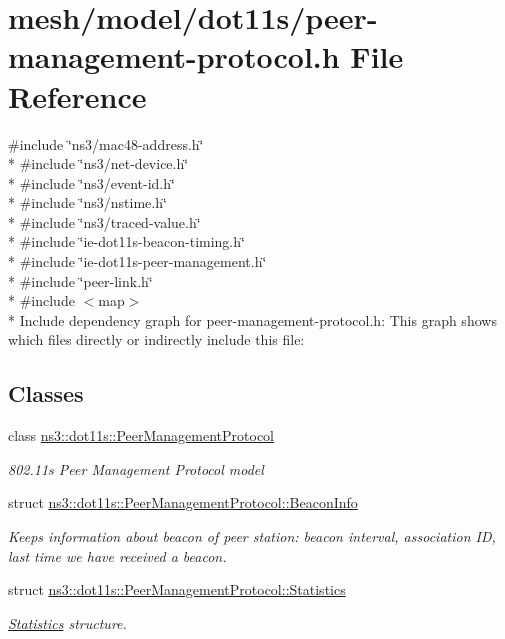 \hypertarget{peer-management-protocol_8h}{}\section{mesh/model/dot11s/peer-\/management-\/protocol.h File Reference}
\label{peer-management-protocol_8h}
{\ttfamily \#include \char`\"{}ns3/mac48-\/address.\+h\char`\"{}}\\*
{\ttfamily \#include \char`\"{}ns3/net-\/device.\+h\char`\"{}}\\*
{\ttfamily \#include \char`\"{}ns3/event-\/id.\+h\char`\"{}}\\*
{\ttfamily \#include \char`\"{}ns3/nstime.\+h\char`\"{}}\\*
{\ttfamily \#include \char`\"{}ns3/traced-\/value.\+h\char`\"{}}\\*
{\ttfamily \#include \char`\"{}ie-\/dot11s-\/beacon-\/timing.\+h\char`\"{}}\\*
{\ttfamily \#include \char`\"{}ie-\/dot11s-\/peer-\/management.\+h\char`\"{}}\\*
{\ttfamily \#include \char`\"{}peer-\/link.\+h\char`\"{}}\\*
{\ttfamily \#include $<$map$>$}\\*
Include dependency graph for peer-\/management-\/protocol.h\+:
This graph shows which files directly or indirectly include this file\+:
\subsection*{Classes}
\begin{DoxyCompactItemize}
\item 
class \hyperlink{classns3_1_1dot11s_1_1PeerManagementProtocol}{ns3\+::dot11s\+::\+Peer\+Management\+Protocol}
\begin{DoxyCompactList}\small\item\em 802.\+11s Peer Management Protocol model \end{DoxyCompactList}\item 
struct \hyperlink{structns3_1_1dot11s_1_1PeerManagementProtocol_1_1BeaconInfo}{ns3\+::dot11s\+::\+Peer\+Management\+Protocol\+::\+Beacon\+Info}
\begin{DoxyCompactList}\small\item\em Keeps information about beacon of peer station\+: beacon interval, association ID, last time we have received a beacon. \end{DoxyCompactList}\item 
struct \hyperlink{structns3_1_1dot11s_1_1PeerManagementProtocol_1_1Statistics}{ns3\+::dot11s\+::\+Peer\+Management\+Protocol\+::\+Statistics}
\begin{DoxyCompactList}\small\item\em \hyperlink{structns3_1_1dot11s_1_1PeerManagementProtocol_1_1Statistics}{Statistics} structure. \end{DoxyCompactList}\end{DoxyCompactItemize}
